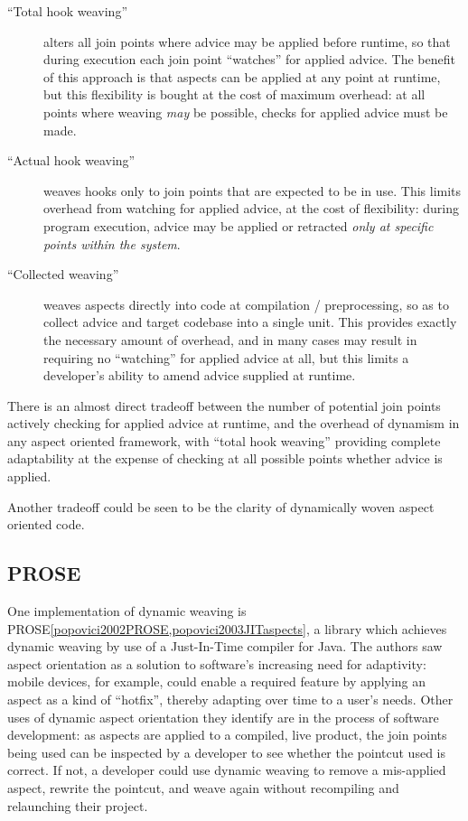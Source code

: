 \begin{description}
    \item[``Total hook weaving''] alters all join points where advice may be
    applied before runtime, so that during execution each join point ``watches''
    for applied advice. The benefit of this approach is that aspects can be
    applied at any point at runtime, but this flexibility is bought at the cost
    of maximum overhead: at all points where weaving \emph{may} be possible,
    checks for applied advice must be made.
    \item[``Actual hook weaving''] weaves hooks only to join points that are
    expected to be in use. This limits overhead from watching for applied
    advice, at the cost of flexibility: during program execution, advice may be
    applied or retracted \emph{only at specific points within the system}.
    \item[``Collected weaving''] weaves aspects directly into code at
    compilation / preprocessing, so as
    to collect advice and target codebase into a single unit. This provides
    exactly the necessary amount of overhead, and in many cases may result in
    requiring no ``watching'' for applied advice at all, but this limits a
    developer's ability to amend advice supplied at runtime.
\end{description}

There is an almost direct tradeoff between the number of potential join points
actively checking for applied advice at runtime, and the overhead of dynamism in
any aspect oriented framework, with ``total hook weaving'' providing complete
adaptability at the expense of checking at all possible points whether advice is
applied.

Another tradeoff could be seen to be the clarity of dynamically woven aspect
oriented code.


\subsection{PROSE}\label{subsec:PROSE} One implementation of dynamic weaving is
PROSE\cref{popovici2002PROSE,popovici2003JITaspects}, a library which achieves
dynamic weaving by use of a Just-In-Time compiler for Java. The authors saw
aspect orientation as a solution to software's increasing need for adaptivity:
mobile devices, for example, could enable a required feature by applying an
aspect as a kind of ``hotfix'', thereby adapting over time to a user's needs.
Other uses of dynamic aspect orientation they identify are in the process of
software development: as aspects are applied to a compiled, live product, the
join points being used can be inspected by a developer to see whether the
pointcut used is correct. If not, a developer could use dynamic weaving to
remove a mis-applied aspect, rewrite the pointcut, and weave again without
recompiling and relaunching their project.

